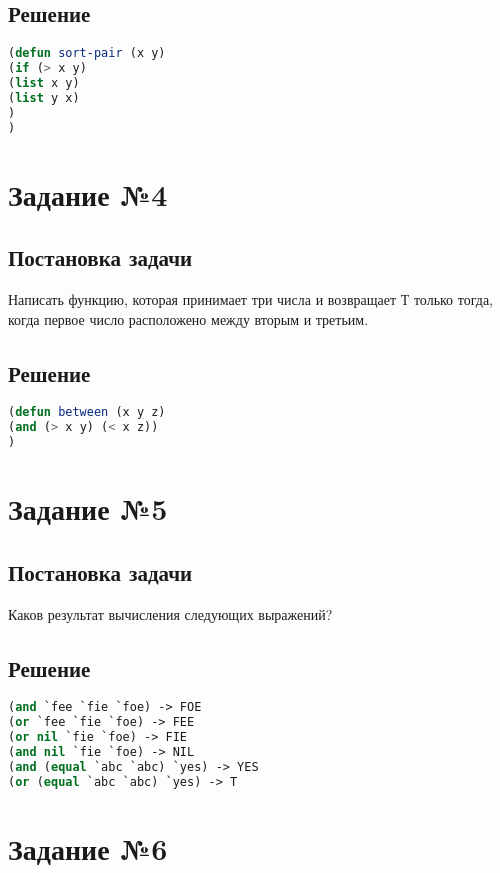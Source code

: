 \subsection*{Решение}
\begin{lstlisting}[label=third,caption=Решение задания №3, language=lisp]
(defun sort-pair (x y) 
(if (> x y)
(list x y)
(list y x)
)
)
\end{lstlisting}

\section*{Задание №4}
\subsection*{Постановка задачи}
Написать функцию, которая принимает три числа и возвращает Т только тогда, когда первое число расположено между вторым и третьим.

\subsection*{Решение}
\begin{lstlisting}[label=4,caption=Решение задания №4, language=lisp]
(defun between (x y z) 
(and (> x y) (< x z))
)
\end{lstlisting}

\section*{Задание №5}
\subsection*{Постановка задачи}
Каков результат вычисления следующих выражений?

\subsection*{Решение}
\begin{lstlisting}[label=5,caption=Решение задания №5, language=lisp]
(and `fee `fie `foe) -> FOE
(or `fee `fie `foe) -> FEE
(or nil `fie `foe) -> FIE
(and nil `fie `foe) -> NIL
(and (equal `abc `abc) `yes) -> YES
(or (equal `abc `abc) `yes) -> T
\end{lstlisting}

\section*{Задание №6}
